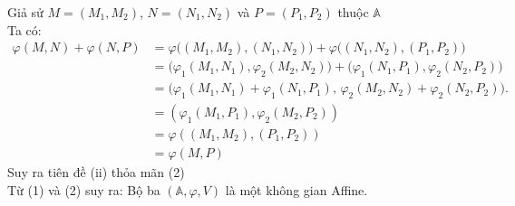 \documentclass[12pt,a4paper]{article}
\begin{document}
Giả sử $M = (M_1, M_2)$, $N = (N_1, N_2)$ và $P = (P_1, P_2)$ thuộc \( \mathbb{A}\) \\[4pt]
Ta có: \[
\begin{aligned}
\varphi(M,N) + \varphi(N,P)
&= \varphi\bigl((M_1,M_2),(N_1,N_2)\bigr) + \varphi\bigl((N_1,N_2),(P_1,P_2)\bigr)  \\
&= \bigl(\varphi_1(M_1,N_1),\varphi_2(M_2,N_2)\bigr) + \bigl(\varphi_1(N_1,P_1),\varphi_2(N_2,P_2)\bigr)  \\
&= \bigl(\varphi_1(M_1, N_1) + \varphi_1(N_1, P_1),\, \varphi_2(M_2, N_2) + \varphi_2(N_2, P_2)\bigr). \\
&= (\varphi_1(M_1, P_1), \varphi_2(M_2, P_2)) \\
&= \varphi((M_1, M_2), (P_1, P_2)) \\
&= \varphi(M, P)
\end{aligned}
\]
Suy ra tiên đề (ii) thỏa mãn \qquad (2) \\[4pt]
Từ (1) và (2) suy ra: Bộ ba $(\mathbb{A},\varphi,V)$ là một không gian Affine.
\end{document}
